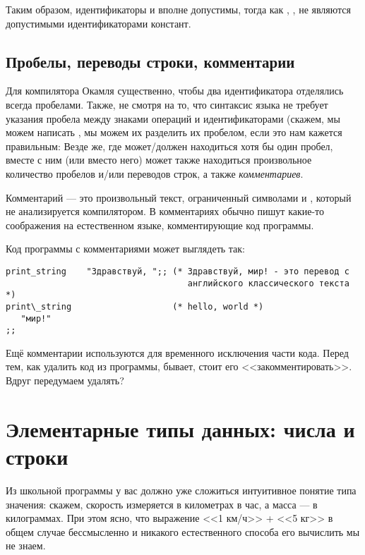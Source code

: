 Таким образом, идентификаторы  и \s{\_\_\_} вполне допустимы, тогда как
, ,  не являются допустимыми идентификаторами констант.


\subsection{Пробелы, переводы строки, комментарии}

Для компилятора Окамля существенно, чтобы два идентификатора 
отделялись всегда пробелами. Также, не смотря на то, что синтаксис языка не 
требует указания пробела между знаками операций и идентификаторами
(скажем, мы можем написать , мы можем их разделить
их пробелом, если это нам кажется правильным: 
Везде же, где может/должен находиться хотя бы один 
пробел, вместе с ним (или вместо него) может также находиться произвольное 
количество пробелов и/или переводов строк, а также \emph{комментариев}.

Комментарий --- это произвольный текст, ограниченный символами 
\s{(*} и \s{*)}, который не анализируется компилятором. В комментариях
обычно пишут какие-то соображения на естественном языке, 
комментирующие код программы. 

Код программы с комментариями может выглядеть так:

\begin{verbatim}
print_string    "Здравствуй, ";; (* Здравствуй, мир! - это перевод с 
                                    английского классического текста *)
print\_string                    (* hello, world *)
   "мир!"
;;		 
\end{verbatim}

Ещё комментарии используются для временного исключения части кода. Перед
тем, как удалить код из программы, бывает, стоит его <<закомментировать>>. 
Вдруг передумаем удалять?

\section{Элементарные типы данных: числа и строки}

Из школьной программы у вас должно уже сложиться интуитивное понятие типа
значения: скажем, скорость измеряется в километрах в час, а масса ---
в килограммах. При этом ясно, что выражение <<1 км/ч>> + <<5 кг>> 
в общем случае бессмысленно и никакого естественного способа его вычислить 
мы не знаем.

